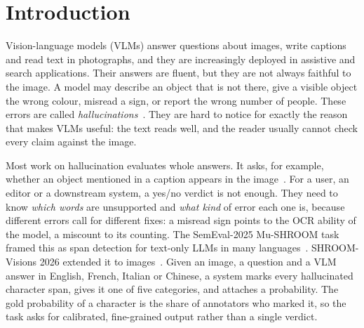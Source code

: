 \chapter{Introduction}

Vision-language models (VLMs) answer questions about images, write captions and read text in photographs, and they are increasingly deployed in assistive and search applications. Their answers are fluent, but they are not always faithful to the image. A model may describe an object that is not there, give a visible object the wrong colour, misread a sign, or report the wrong number of people. These errors are called \emph{hallucinations}~\cite{ji2023survey,rohrbach2018object}. They are hard to notice for exactly the reason that makes VLMs useful: the text reads well, and the reader usually cannot check every claim against the image.

Most work on hallucination evaluates whole answers. It asks, for example, whether an object mentioned in a caption appears in the image~\cite{rohrbach2018object,li2023pope}. For a user, an editor or a downstream system, a yes/no verdict is not enough. They need to know \emph{which words} are unsupported and \emph{what kind} of error each one is, because different errors call for different fixes: a misread sign points to the OCR ability of the model, a miscount to its counting. The SemEval-2025 Mu-SHROOM task framed this as span detection for text-only LLMs in many languages~\cite{vazquez-etal-2025-semeval}. SHROOM-Visions 2026 extended it to images~\cite{vazquez2026shroomvisionsoverview,mickus2026humansdreamelectricsheep}. Given an image, a question and a VLM answer in English, French, Italian or Chinese, a system marks every hallucinated character span, gives it one of five categories, and attaches a probability. The gold probability of a character is the share of annotators who marked it, so the task asks for calibrated, fine-grained output rather than a single verdict.

